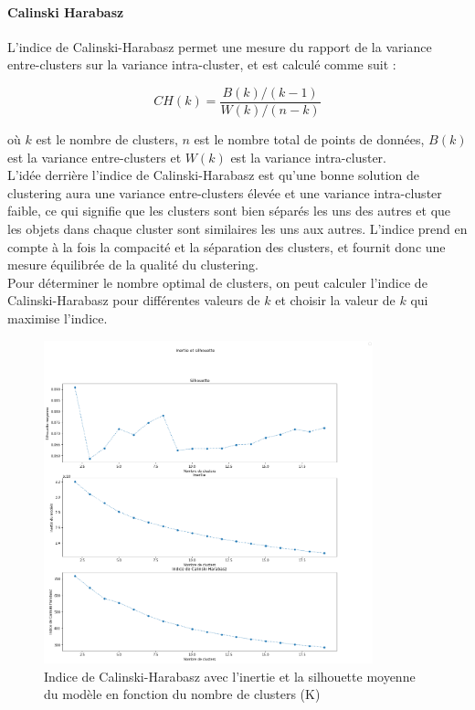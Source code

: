 \documentclass{article}
\begin{document}
\paragraph{Calinski Harabasz} L'indice de Calinski-Harabasz permet une mesure du rapport de la variance entre-clusters sur la variance intra-cluster, et est calculé comme suit :

$$CH(k) = \frac{B(k) / (k - 1)}{W(k) / (n - k)}$$

où $k$ est le nombre de clusters, $n$ est le nombre total de points de données, $B(k)$ est la variance entre-clusters et $W(k)$ est la variance intra-cluster. \\

L'idée derrière l'indice de Calinski-Harabasz est qu'une bonne solution de clustering aura une variance entre-clusters élevée et une variance intra-cluster faible, ce qui signifie que les clusters sont bien séparés les uns des autres et que les objets dans chaque cluster sont similaires les uns aux autres. L'indice prend en compte à la fois la compacité et la séparation des clusters, et fournit donc une mesure équilibrée de la qualité du clustering. \\

Pour déterminer le nombre optimal de clusters, on peut calculer l'indice de Calinski-Harabasz pour différentes valeurs de $k$ et choisir la valeur de $k$ qui maximise l'indice.
\begin{figure}[H]
	\centering
	\includegraphics[width=0.85\textwidth]{"./Images/CH.png"}
	\caption{\centering Indice de Calinski-Harabasz avec l'inertie et la silhouette moyenne du modèle en fonction du nombre de clusters (K)}
	\label{fig:CH}
\end{figure}
\end{document}
